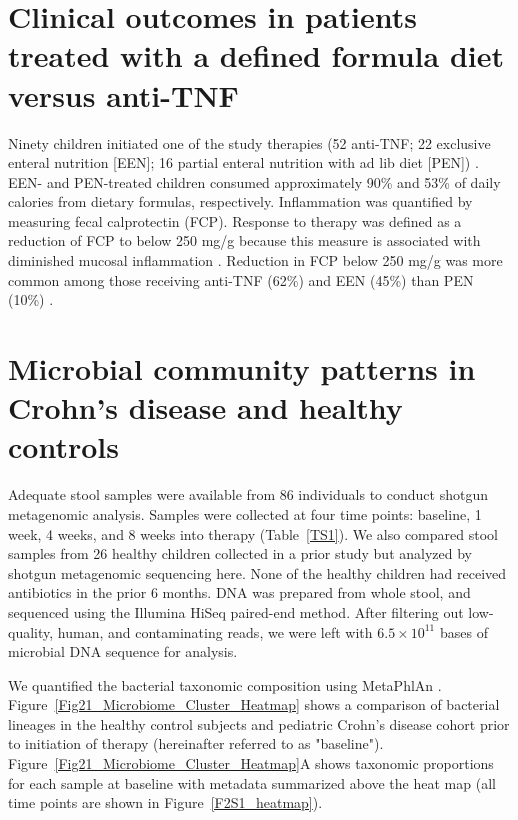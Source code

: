 \section{Clinical outcomes in patients treated with a defined formula diet versus anti-TNF}
Ninety children initiated one of the study therapies (52 anti-TNF; 22 exclusive enteral nutrition [EEN]; 16 partial enteral nutrition with ad lib diet [PEN]) \citep{lee2015comparative}. EEN- and PEN-treated children consumed approximately 90\% and 53\% of daily calories from dietary formulas, respectively. Inflammation was quantified by measuring fecal calprotectin (FCP). Response to therapy was defined as a reduction of FCP to below 250 mg/g because this measure is associated with diminished mucosal inflammation \citep{Lin:2014hm}. Reduction in FCP below 250 mg/g was more common among those receiving anti-TNF (62\%) and EEN (45\%) than PEN (10\%) \citep{lee2015comparative}.



\section{Microbial community patterns in Crohn's disease and healthy controls}
Adequate stool samples were available from 86 individuals to conduct shotgun metagenomic analysis. Samples were collected at four time points: baseline, 1 week, 4 weeks, and 8 weeks into therapy (Table~\ref{TS1}). We also compared stool samples from 26 healthy children collected in a prior study \citep{wu2011linking} but analyzed by shotgun metagenomic sequencing here. None of the healthy children had received antibiotics in the prior 6 months. DNA was prepared from whole stool, and sequenced using the Illumina HiSeq paired-end method. After filtering out low-quality, human, and contaminating reads, we were left with $6.5 \times 10^{11}$ bases of microbial DNA sequence for analysis.



We quantified the bacterial taxonomic composition using MetaPhlAn \citep{segata2012metagenomic}. Figure~\ref{Fig21_Microbiome_Cluster_Heatmap} shows a comparison of bacterial lineages in the healthy control subjects and pediatric Crohn's disease cohort prior to initiation of therapy (hereinafter referred to as "baseline"). Figure~\ref{Fig21_Microbiome_Cluster_Heatmap}A shows taxonomic proportions for each sample at baseline with metadata summarized above the heat map (all time points are shown in Figure~\ref{F2S1_heatmap}). 


